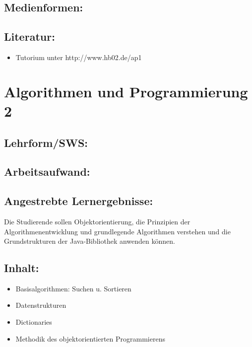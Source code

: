 \section{Medienformen:}\label{medienformen}

\section{Literatur:}\label{literatur}

\begin{itemize}
\tightlist
\item
  Tutorium unter http://www.hb02.de/ap1
\end{itemize}

\chapter{Algorithmen und Programmierung
2}\label{algorithmen-und-programmierung-2}

\section{Lehrform/SWS:}\label{lehrformsws-1}

\section{Arbeitsaufwand:}\label{arbeitsaufwand-1}

\section{Angestrebte
Lernergebnisse:}\label{angestrebte-lernergebnisse-1}

Die Studierende sollen Objektorientierung, die Prinzipien der
Algorithmenentwicklung und grundlegende Algorithmen verstehen und die
Grundstrukturen der Java-Bibliothek anwenden können.

\section{Inhalt:}\label{inhalt-1}

\begin{itemize}
\tightlist
\item
  Basisalgorithmen: Suchen u. Sortieren
\item
  Datenstrukturen
\item
  Dictionaries
\item
  Methodik des objektorientierten Programmierens
\end{itemize}


